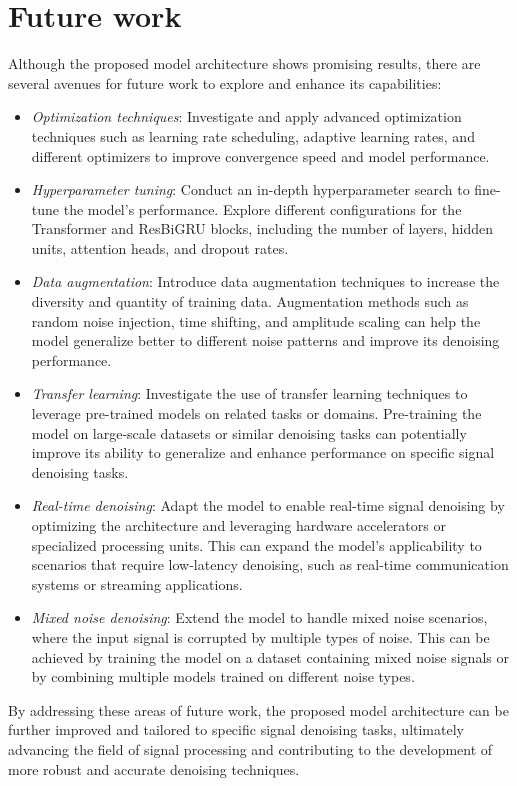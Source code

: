 \documentclass[a4paper, noexaminfo]{sapthesis}
\begin{document}
\section{Future work}
Although the proposed model architecture shows promising results, there 
are several avenues for future work to explore and enhance its 
capabilities:
\begin{itemize}
\item \textit{Optimization techniques}: Investigate and apply advanced 
optimization techniques such as learning rate scheduling, adaptive 
learning rates, and different optimizers to improve convergence speed 
and model performance.
\item \textit{Hyperparameter tuning}: Conduct an in-depth hyperparameter 
search to fine-tune the model's performance. Explore different 
configurations for the Transformer and ResBiGRU blocks, including the 
number of layers, hidden units, attention heads, and dropout rates.
\item \textit{Data augmentation}: Introduce data augmentation techniques to 
increase the diversity and quantity of training data. Augmentation 
methods such as random noise injection, time shifting, and amplitude 
scaling can help the model generalize better to different noise 
patterns and improve its denoising performance.
\item \textit{Transfer learning}: Investigate the use of transfer learning 
techniques to leverage pre-trained models on related tasks or domains. 
Pre-training the model on large-scale datasets or similar denoising 
tasks can potentially improve its ability to generalize and enhance 
performance on specific signal denoising tasks.
\item \textit{Real-time denoising}: Adapt the model to enable real-time 
signal denoising by optimizing the architecture and leveraging 
hardware accelerators or specialized processing units. This can 
expand the model's applicability to scenarios that require low-latency 
denoising, such as real-time communication systems or streaming 
applications.
\item \textit{Mixed noise denoising}: Extend the model to handle mixed noise
  scenarios, where the input signal is corrupted by multiple types of 
  noise. This can be achieved by training the model on a dataset 
  containing mixed noise signals or by combining multiple models 
  trained on different noise types.
\end{itemize}
By addressing these areas of future work, the proposed model 
architecture can be further improved and tailored to specific signal 
denoising tasks, ultimately advancing the field of signal processing 
and contributing to the development of more robust and accurate denoising 
techniques.
\end{document}
